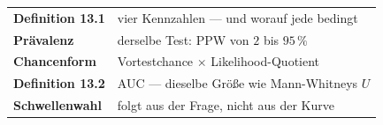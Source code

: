 \begin{merksatz}
\begin{center}
\renewcommand{\arraystretch}{1.5}
\begin{tabular}{@{}P{3.2cm}P{5.4cm}@{}}
\toprule
\textbf{Definition 13.1} & vier Kennzahlen --- und worauf jede bedingt\\
\textbf{Prävalenz} & derselbe Test: PPW von $2$ bis $95\,\%$\\
\textbf{Chancenform} & Vortestchance $\times$ Likelihood-Quotient\\
\textbf{Definition 13.2} & AUC --- dieselbe Größe wie Mann-Whitneys $U$\\
\textbf{Schwellenwahl} & folgt aus der Frage, nicht aus der Kurve\\
\bottomrule
\end{tabular}
\end{center}

\begin{center}
\begin{minipage}{0.88\textwidth}
\end{minipage}
\end{center}
\end{merksatz}
